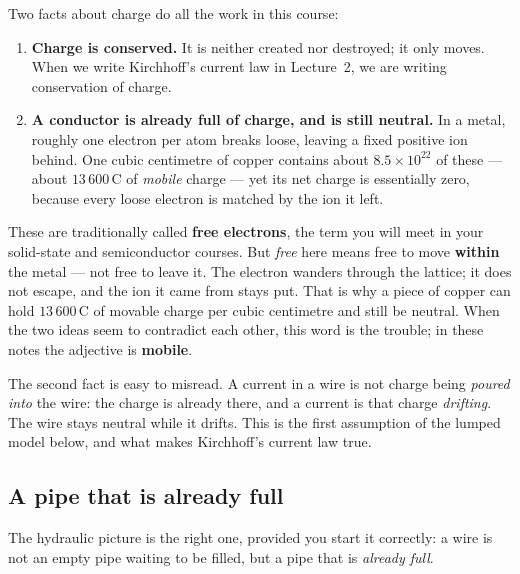 \documentclass[11pt,a4paper]{article}
\newcommand{\uni}[1]{\,\mathrm{#1}}
\newcommand{\Cb}{\uni{C}}  \newcommand{\s}{\uni{s}}
\begin{document}
\vspace{0.4em}

Two facts about charge do all the work in this course:

\begin{enumerate}
  \item \textbf{Charge is conserved.} It is neither created nor destroyed; it only moves.
        When we write Kirchhoff's current law in Lecture~2, we are writing conservation of
        charge.
  \item \textbf{A conductor is already full of charge, and is still neutral.} In a metal,
        roughly one electron per atom breaks loose, leaving a fixed positive ion behind.
        One cubic centimetre of copper contains about $8.5\times10^{22}$ of these ---
        about $13\,600\Cb$ of \emph{mobile} charge --- yet its net charge is essentially
        zero, because every loose electron is matched by the ion it left.
\end{enumerate}

\begin{cautionbox}
These are traditionally called \textbf{free electrons}, the term you will meet in your
solid-state and semiconductor courses. But \emph{free} here means free to move
\textbf{within} the metal --- not free to leave it. The electron wanders through the
lattice; it does not escape, and the ion it came from stays put. That is why a piece of
copper can hold $13\,600\Cb$ of movable charge per cubic centimetre and still be neutral.
When the two ideas seem to contradict each other, this word is the trouble; in these notes
the adjective is \textbf{mobile}.
\end{cautionbox}

The second fact is easy to misread. A current in a wire is not charge being \emph{poured
into} the wire: the charge is already there, and a current is that charge
\emph{drifting}. The wire stays neutral while it drifts. This is the first assumption of
the lumped model below, and what makes Kirchhoff's current law true.

\subsection{A pipe that is already full}

The hydraulic picture is the right one, provided you start it correctly: a wire is not an
empty pipe waiting to be filled, but a pipe that is \emph{already full}.
\end{document}
